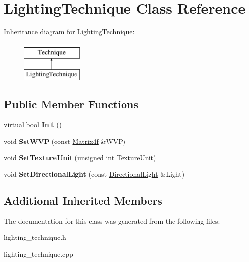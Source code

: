 \hypertarget{classLightingTechnique}{\section{Lighting\-Technique Class Reference}
\label{classLightingTechnique}
}
Inheritance diagram for Lighting\-Technique\-:\begin{figure}[H]
\begin{center}
\leavevmode
\includegraphics[height=2.000000cm]{classLightingTechnique}
\end{center}
\end{figure}
\subsection*{Public Member Functions}
\begin{DoxyCompactItemize}
\item 
\hypertarget{classLightingTechnique_a0409e6158672177277d756d3e0585c4d}{virtual bool {\bfseries Init} ()}\label{classLightingTechnique_a0409e6158672177277d756d3e0585c4d}

\item 
\hypertarget{classLightingTechnique_a30d9a915fac215d5b86c43bc6285ae30}{void {\bfseries Set\-W\-V\-P} (const \hyperlink{classMatrix4f}{Matrix4f} \&W\-V\-P)}\label{classLightingTechnique_a30d9a915fac215d5b86c43bc6285ae30}

\item 
\hypertarget{classLightingTechnique_a4d8e1b4ae9015f5eef18b808061af22f}{void {\bfseries Set\-Texture\-Unit} (unsigned int Texture\-Unit)}\label{classLightingTechnique_a4d8e1b4ae9015f5eef18b808061af22f}

\item 
\hypertarget{classLightingTechnique_afee3e4439511c07b91aac74d80b25397}{void {\bfseries Set\-Directional\-Light} (const \hyperlink{structDirectionalLight}{Directional\-Light} \&Light)}\label{classLightingTechnique_afee3e4439511c07b91aac74d80b25397}

\end{DoxyCompactItemize}
\subsection*{Additional Inherited Members}


The documentation for this class was generated from the following files\-:\begin{DoxyCompactItemize}
\item 
lighting\-\_\-technique.\-h\item 
lighting\-\_\-technique.\-cpp\end{DoxyCompactItemize}
